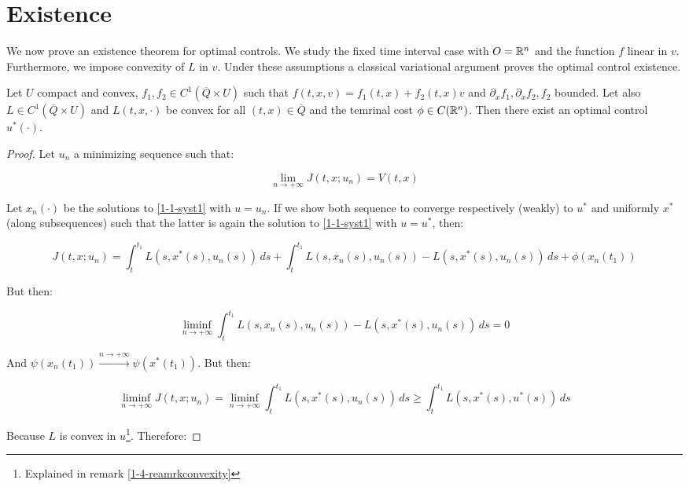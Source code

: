 \section{Existence}

We now prove an existence theorem for optimal controls.
We study the fixed time interval case with $O=\mathbb{R}^n$ and the function $f$ linear in $v$.
Furthermore, we impose convexity of $L$ in $v$. Under these assumptions a classical variational
argument proves the optimal control existence.
\begin{theorem}
    Let $U$ compact and convex, $f_1,f_2\in C^1(\overline{Q}\times U)$ such that $f(t,x,v)=f_1(t,x)+f_2(t,x)v$ and $\partial_xf_{1},\partial_xf_2,f_2$ bounded.
    Let also $L\in C^1(\overline{Q}\times U)$ and $L(t,x,\cdot)$ be convex for all $(t,x)\in\overline{Q}$ and the temrinal cost $\phi\in C(\mathbb{R}^n)$. Then there exist an optimal control $u^{\ast}(\cdot)$.

    \begin{proof}
        Let $u_n$ a minimizing sequence such that:

        \begin{equation}
            \lim_{n\to+\infty} J(t,x;u_n) = V(t,x)
        \end{equation}

        Let $x_n(\cdot)$ be the solutions to \ref{1-1-syst1} with $u=u_n$. If we show both sequence to converge respectively 
        (weakly) to $u^{\ast}$ and uniformly $x^{\ast}$ (along subsequences) such that the latter is again the solution to \ref{1-1-syst1} with $u=u^{\ast}$, then:

        \[J(t,x;u_n) = \int_t^{t_1} L(s,x^{\ast}(s),u_n(s)) \,ds + \int_t^{t_1} L(s,x_n(s),u_n(s)) - L(s,x^{\ast}(s),u_n(s)) \,ds + \phi(x_n(t_1))\]

        But then:

        \[\liminf_{n\to+\infty} \int_t^{t_1} L(s,x_n(s),u_n(s)) - L(s,x^{\ast}(s),u_n(s)) \,ds = 0\]

        And $\psi(x_n(t_1))\xrightarrow{n\to+\infty}\psi(x^{\ast}(t_1))$. But then:

        \begin{equation}\label{1-4-existenceliminf}
            \liminf_{n\to+\infty} J(t,x;u_n) = \liminf_{n\to+\infty} \int_t^{t_1} L(s,x^{\ast}(s),u_n(s)) \,ds \geq \int_t^{t_1} L(s,x^{\ast}(s),u^{\ast}(s)) \,ds 
        \end{equation}

        Because $L$ is convex in $u$\footnote{Explained in remark \ref{1-4-reamrkconvexity}}. Therefore:


\end{proof}
\end{theorem}
